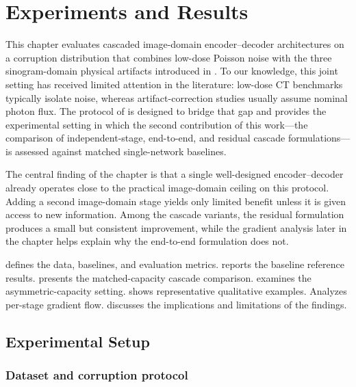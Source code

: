 \chapter{Experiments and Results}
\label{chap:experiments}

This chapter evaluates cascaded image-domain encoder--decoder architectures on a corruption distribution that combines low-dose Poisson noise with the three sinogram-domain physical artifacts introduced in . To our knowledge, this joint setting has received limited attention in the literature: low-dose CT benchmarks typically isolate noise, whereas artifact-correction studies usually assume nominal photon flux. The protocol of  is designed to bridge that gap and provides the experimental setting in which the second contribution of this work---the comparison of independent-stage, end-to-end, and residual cascade formulations---is assessed against matched single-network baselines.

The central finding of the chapter is that a single well-designed encoder--decoder already operates close to the practical image-domain ceiling on this protocol. Adding a second image-domain stage yields only limited benefit unless it is given access to new information. Among the cascade variants, the residual formulation produces a small but consistent improvement, while the gradient analysis later in the chapter helps explain why the end-to-end formulation does not.

 defines the data, baselines, and evaluation metrics.
 reports the baseline reference results.
 presents the matched-capacity cascade comparison.
 examines the asymmetric-capacity setting.
 shows representative qualitative examples.
 Analyzes per-stage gradient flow.
 discusses the implications and limitations of the findings.
\section{Experimental Setup}
\label{sec:exp_setup}

\subsection{Dataset and corruption protocol}
\label{subsec:exp_dataset}

